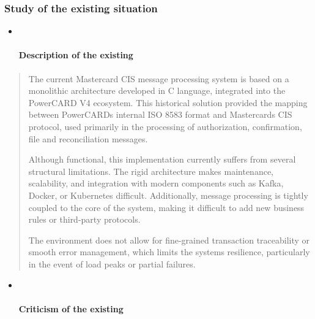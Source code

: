 \documentclass[12pt,a4paper]{report}
\begin{document}
\hypertarget{study-of-the-existing-situation}{%
\subsubsection{\texorpdfstring{\textbf{Study of the existing
situation}}{Study of the existing situation}}\label{study-of-the-existing-situation}}

\begin{itemize}
\item ~
  \hypertarget{description-of-the-existing}{%
  \paragraph{\texorpdfstring{\textbf{Description of the
  existing}}{Description of the existing}}\label{description-of-the-existing}}
\end{itemize}

\begin{quote}
The current Mastercard CIS message processing system is based on a
monolithic architecture developed in C language, integrated into the
PowerCARD V4 ecosystem. This historical solution provided the mapping
between PowerCARD\textquotesingle s internal ISO 8583 format and
Mastercard\textquotesingle s CIS protocol, used primarily in the
processing of authorization, confirmation, file and reconciliation
messages.

Although functional, this implementation currently suffers from several
structural limitations. The rigid architecture makes maintenance,
scalability, and integration with modern components such as Kafka,
Docker, or Kubernetes difficult. Additionally, message processing is
tightly coupled to the core of the system, making it difficult to add
new business rules or third-party protocols.

The environment does not allow for fine-grained transaction traceability
or smooth error management, which limits the system\textquotesingle s
resilience, particularly in the event of load peaks or partial failures.
\end{quote}

\begin{itemize}
\item ~
  \hypertarget{criticism-of-the-existing}{%
  \paragraph{\texorpdfstring{\textbf{Criticism of the
  existing}}{Criticism of the existing}}\label{criticism-of-the-existing}}
\end{itemize}
\end{document}
